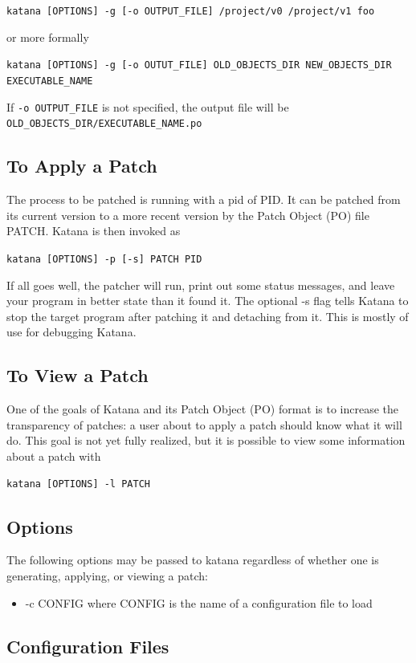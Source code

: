 \documentclass[11pt]{article}
\begin{document}
   \texttt{katana [OPTIONS] -g [-o OUTPUT\_FILE] /project/v0 /project/v1 foo}

   or more formally

   \texttt{katana [OPTIONS] -g [-o OUTUT\_FILE] OLD\_OBJECTS\_DIR NEW\_OBJECTS\_DIR EXECUTABLE\_NAME}

   If \texttt{-o OUTPUT\_FILE} is not specified, the output file will be \texttt{OLD\_OBJECTS\_DIR/EXECUTABLE\_NAME.po}
\subsection{To Apply a Patch}
\label{sec-6.3}

   The process to be patched is running with a pid of PID. It can be
   patched from its current version to a more recent version by the
   Patch Object (PO) file PATCH. Katana is then invoked as

   \texttt{katana [OPTIONS] -p [-s] PATCH PID}

   If all goes well, the patcher will run, print out some status
   messages, and leave your program in better state than it found
   it. The optional -s flag tells Katana to stop the target program
   after patching it and detaching from it. This is mostly of use for
   debugging Katana.
\subsection{To View a Patch}
\label{sec-6.4}

   One of the goals of Katana and its Patch Object (PO) format is to
   increase the transparency of patches: a user about to apply a patch
   should know what it will do. This goal is not yet fully realized,
   but it is possible to view some information about a patch with

   \texttt{katana [OPTIONS] -l PATCH}
\subsection{Options}
\label{sec-6.5}

   The following options may be passed to katana regardless of whether
   one is generating, applying, or viewing a patch:
\begin{itemize}
\item -c CONFIG
     where CONFIG is the name of a configuration file to load
\end{itemize}
\subsection{Configuration Files}
\label{sec-6.6}
\end{document}
